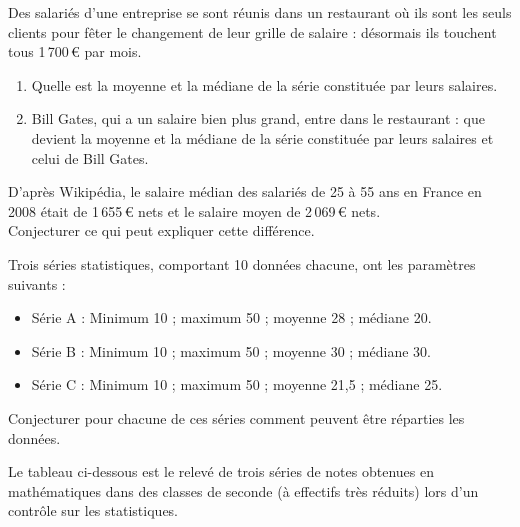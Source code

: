 \begin{multicols}{2}

\begin{exo}
 Des salari\'es d'une entreprise se sont r\'eunis dans un restaurant o\`u ils sont les seuls clients pour f\^eter le changement de leur grille de salaire : d\'esormais ils touchent tous 1\,700\,\euro{} par mois.
 \begin{enumerate}
  \item Quelle est la moyenne et la m\'ediane de la s\'erie constitu\'ee par leurs salaires.
  \item Bill Gates, qui a un salaire bien plus grand, entre dans le restaurant : que devient la moyenne et la m\'ediane de la s\'erie constitu\'ee par leurs salaires et celui de Bill Gates.
 \end{enumerate}

\end{exo}

\begin{exo}
 D'apr\`es Wikip\'edia, le salaire m\'edian des salari\'es de 25 \`a 55 ans en France en 2008 \'etait de 1\,655\,\euro{} nets et le salaire moyen de 2\,069\,\euro{} nets.\\
 Conjecturer ce qui peut expliquer cette diff\'erence.
\end{exo}

\begin{exo}
Trois s\'eries statistiques, comportant 10 donn\'ees chacune, ont les param\`etres
suivants :
\begin{itemize}
	\item S\'erie A : Minimum 10 ; maximum 50 ; moyenne 28 ; m\'ediane 20.
	\item S\'erie B : Minimum 10 ; maximum 50 ; moyenne 30 ; m\'ediane 30.
	\item S\'erie C : Minimum 10 ; maximum 50 ; moyenne 21,5 ; m\'ediane 25.
\end{itemize}
Conjecturer pour chacune de ces s\'eries comment peuvent \^etre r\'eparties les
donn\'ees.
\end{exo}

\sautcol


\begin{exo}\label{chap4troisclassesenonce}
Le tableau ci-dessous %
est le relev\'e de trois s\'eries de notes obtenues en math\'ematiques dans des classes de
seconde (\`a effectifs tr\`es r\'eduits) lors d'un contrôle sur les statistiques.


\end{exo}
\end{multicols}
